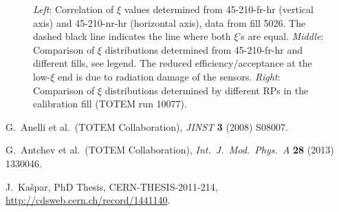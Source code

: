 \documentclass{article}
\def\etal{et al.}
\def\Name#1{#1, }
\def\Review#1#2#3#4{{\it #1} {\bf #2} (#3) #4}
\begin{document}
\begin{figure}[h!]
\begin{center}
\hskip-15mm
\caption{%
{\it Left}: Correlation of $\xi$ values determined from 45-210-fr-hr (vertical axis) and 45-210-nr-hr (horizontal axis), data from fill 5026. The dashed black line indicates the line where both $\xi$'s are equal.
\hfil\break
{\it Middle}: Comparison of $\xi$ distributions determined from 45-210-fr-hr and different fills, see legend. The reduced efficiency/acceptance at the low-$\xi$ end is due to radiation damage of the sensors.
\hfil\break
{\it Right}: Comparison of $\xi$ distributions determined by different RPs in the calibration fill (TOTEM run 10077).
}
\label{fig:al_opt_val}
\end{center}
\end{figure}




\begin{thebibliography}{99}

	\Name{G.~Anelli \etal{}~(TOTEM Collaboration)}
	\Review{JINST}{3}{2008}{S08007}.

	\Name{G.~Antchev \etal{}~(TOTEM Collaboration)}
	\Review{Int.~J.~Mod.~Phys.~A}{28}{2013}{1330046}.

	\Name{J.~Ka\v spar}
	PhD Thesis, CERN-THESIS-2011-214,
	\url{http://cdsweb.cern.ch/record/1441140}.

\end{thebibliography}
\end{document}
